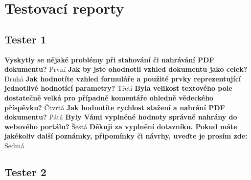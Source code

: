 \chapter{Testovací reporty}
\label{chap:testovaci_reporty}

\section{Tester 1}

\textbf{Vyskytly se nějaké problémy při stahování či nahrávání PDF dokumentu?}
\newline
První
\newline
\newline
\textbf{Jak by jste ohodnotil vzhled dokumentu jako celek?}
\newline
Druhá
\newline
\newline
\textbf{Jak hodnotíte vzhled formuláře a použité prvky reprezentující jednotlivé hodnotící parametry?}
\newline
Třetí
\newline
\newline
\textbf{Byla velikost textového pole dostatečně velká pro případně komentáře ohledně vědeckého příspěvku?}
\newline
Čtvrtá
\newline
\newline
\textbf{Jak hodnotíte rychlost stažení a nahrání PDF dokumentu?} 
\newline
Pátá
\newline
\newline
\textbf{Byly Vámi vyplněné hodnoty správně nahrány do webového portálu?}
\newline
Šestá
\newline
\newline
\textbf{Děkuji za vyplnění dotazníku. Pokud máte jakékoliv další poznámky, připomínky či návrhy, uveďte je prosím zde:}
\newline
Sedmá
\newpage 

\section{Tester 2}


